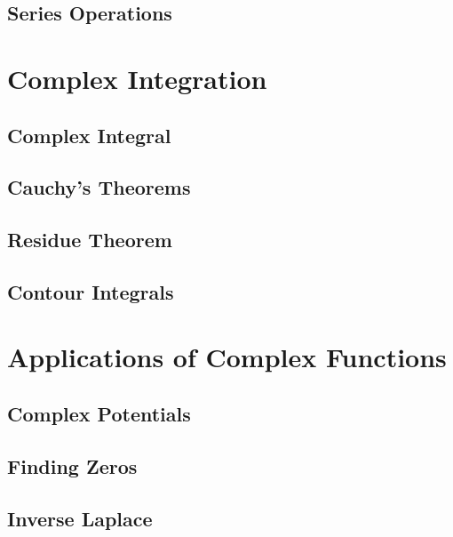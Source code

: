\documentclass[12pt, a4paper, oneside, openright, titlepage]{book}
\begin{document}
\section{Series Operations}



\chapter{Complex Integration}

\section{Complex Integral}


\section{Cauchy's Theorems}


\section{Residue Theorem}


\section{Contour Integrals}


\chapter{Applications of Complex Functions}


\section{Complex Potentials}


\section{Finding Zeros}


\section{Inverse Laplace}
\end{document}
